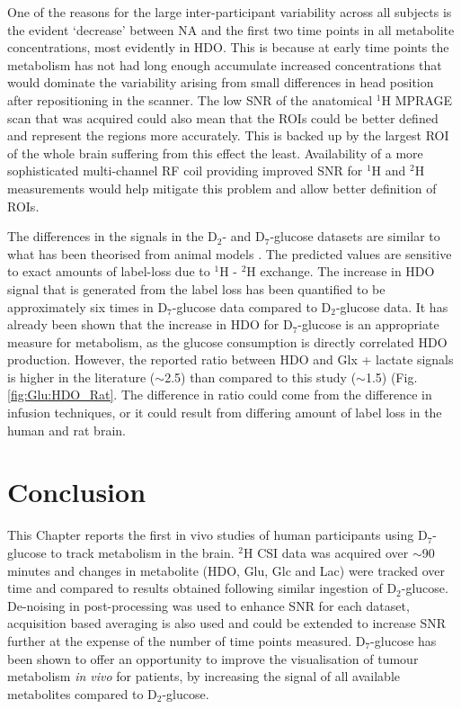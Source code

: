 One of the reasons for the large inter-participant variability across all subjects is the evident ‘decrease’ between \ac{NA} and the first two time points in all metabolite concentrations, most evidently in HDO. This is because at early time points the metabolism has not had long enough accumulate increased concentrations that would dominate the variability arising from small differences in head position after repositioning in the scanner. The low \ac{SNR} of the anatomical $^1$H \ac{MPRAGE} scan that was acquired could also mean that the \ac{ROI}s could be better defined and represent the regions more accurately. This is backed up by the largest ROI of the whole brain suffering from this effect the least. Availability of a more sophisticated multi-channel \ac{RF} coil providing improved \ac{SNR} for $^1$H and $^2$H measurements would help mitigate this problem and allow better definition of \ac{ROI}s.

The differences in the signals in the D$_2$- and D$_7$-glucose datasets are similar to what has been theorised from animal models \cite{Mahar2021DeuteratedGlucose}. The predicted values are sensitive to exact amounts of label-loss due to $^1$H - $^2$H exchange. The increase in \ac{HDO} signal that is generated from the label loss has been quantified to be approximately six times in D$_7$-glucose data compared to D$_2$-glucose data. It has already been shown that the increase in \ac{HDO} for D$_7$-glucose is an appropriate measure for metabolism, as the glucose consumption is directly correlated HDO production. However, the reported ratio between \ac{HDO} and Glx + lactate signals is higher in the literature ($\sim$2.5) than compared to this study ($\sim$1.5) (Fig. \ref{fig:Glu:HDO_Rat}. The difference in ratio could come from the difference in infusion techniques, or it could result from differing amount of label loss in the human and rat brain.


\section{Conclusion}

This Chapter reports the first in vivo studies of human participants using D$_7$-glucose to track metabolism in the brain. $^2$H \ac{CSI} data was acquired over $\sim$90 minutes and changes in metabolite (\ac{HDO}, Glu, Glc and Lac) were tracked over time and compared to results obtained following similar ingestion of D$_2$-glucose. De-noising in post-processing was used to enhance \ac{SNR} for each dataset, acquisition based averaging is also used and could be extended to increase \ac{SNR} further at the expense of the number of time points measured. D$_7$-glucose has been shown to offer an opportunity to improve the visualisation of tumour metabolism \textit{in vivo} for patients, by increasing the signal of all available metabolites compared to D$_2$-glucose. 